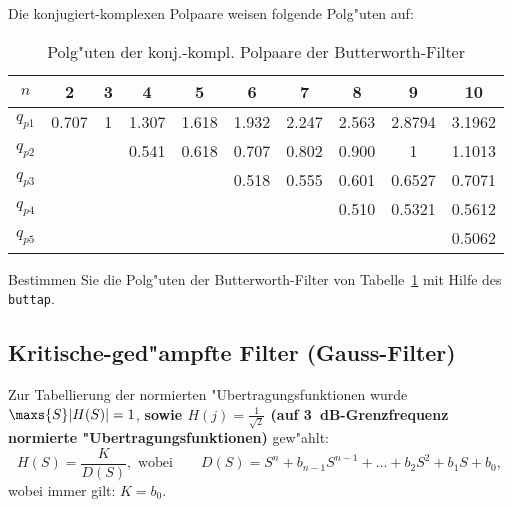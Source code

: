 \begin{table}[!htb]
Die konjugiert-komplexen Polpaare weisen folgende Polg"uten auf:
\begin{center}
{\footnotesize
\begin{tabular}{|c||c|c|c|c|c|c|c|c|c|  }\hline
$n$ & 2 & 3 & 4 & 5 & 6 & 7 & 8 & 9 & 10 \\ \hline\hline
$q_{p1}$ & 0.707 & 1 & 1.307 & 1.618 & 1.932 & 2.247 & 2.563 & 2.8794  & 3.1962\\ \hline
$q_{p2}$ &      &        & 0.541 & 0.618 & 0.707 & 0.802 & 0.900 & 1 &  1.1013 \\ \hline
$q_{p3}$ &      &        &      &      & 0.518 & 0.555 & 0.601 & 0.6527 & 0.7071\\ \hline
$q_{p4}$ &      &        &      &      &      &      & 0.510 & 0.5321 & 0.5612\\ \hline
$q_{p5}$ &      &        &      &      &      &      &   &  & 0.5062\\ \hline
\end{tabular}
}
\end{center}\vspace*{-2mm}
\caption{Polg"uten der konj.-kompl. Polpaare der Butterworth-Filter\label{polg-BW}}
\end{table}
\aufg
Bestimmen Sie die Polg"uten der Butterworth-Filter von Tabelle~\ref{polg-BW} mit Hilfe des \mb
{\tt buttap}.


\clearpage
\subsection{Kritische-ged"ampfte Filter (Gauss-Filter)}\label{anhang_kritisch}
\nit Zur Tabellierung der normierten "Uber\-tra\-gungs\-funk\-tionen wurde $\maxs{S}|H(S)|=1$, {\bf sowie $H(j)=\frac{1}{\sqrt{2}}$ (auf 3~dB-Grenzfrequenz normierte
"Ubertragungsfunktionen)} gew"ahlt:
\begin{equation*}
H(S)=\frac{K}{D(S)},\text{ wobei}\qquad D(S)=S^{n}+b_{n-1}S^{n-1}+ \ldots + b_{2}S^{2}+b_{1}S+b_0,
\end{equation*}
wobei immer gilt: $K=b_0$.

